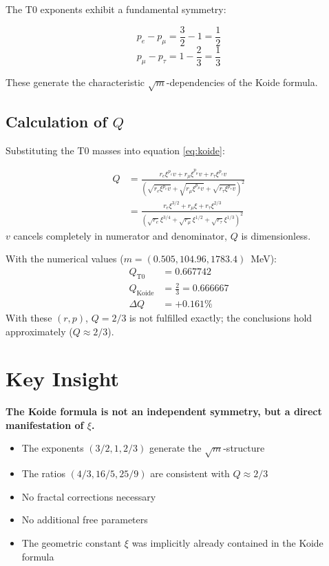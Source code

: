 	The T0 exponents exhibit a fundamental symmetry:
	
	\begin{equation}
		p_e - p_\mu = \frac{3}{2} - 1 = \frac{1}{2}
	\end{equation}
	\begin{equation}
		p_\mu - p_\tau = 1 - \frac{2}{3} = \frac{1}{3}
	\end{equation}
	
	These generate the characteristic $\sqrt{m}$-dependencies of the Koide formula.
	
	\subsection{Calculation of $Q$}
	
	Substituting the T0 masses into equation \eqref{eq:koide}:
	
	\begin{align}
		Q &= \frac{r_e \xi^{p_e} v + r_\mu \xi^{p_\mu} v + r_\tau \xi^{p_\tau} v}{\left(\sqrt{r_e \xi^{p_e} v} + \sqrt{r_\mu \xi^{p_\mu} v} + \sqrt{r_\tau \xi^{p_\tau} v}\right)^2} \\
		&= \frac{r_e \xi^{3/2} + r_\mu \xi + r_\tau \xi^{2/3}}{\left(\sqrt{r_e} \xi^{3/4} + \sqrt{r_\mu} \xi^{1/2} + \sqrt{r_\tau} \xi^{1/3}\right)^2}
	\end{align}
	$v$ cancels completely in numerator and denominator, $Q$ is dimensionless.
	
	With the numerical values ($m = (0.505, 104.96, 1783.4)$~MeV):
	\begin{align}
		Q_{\text{T0}} &= 0.667742 \\
		Q_{\text{Koide}} &= \frac{2}{3} = 0.666667 \\
		\Delta Q &= +0.161\%
	\end{align}
	With these $(r,p)$, $Q = 2/3$ is not fulfilled exactly; the conclusions hold approximately ($Q \approx 2/3$).
	
	\section{Key Insight}
	
	\begin{folgerung}
		\textbf{The Koide formula is not an independent symmetry, but a direct manifestation of $\xi$.}
		
		\begin{itemize}
			\item The exponents $(3/2, 1, 2/3)$ generate the $\sqrt{m}$-structure
			\item The ratios $(4/3, 16/5, 25/9)$ are consistent with $Q \approx 2/3$
			\item No fractal corrections necessary
			\item No additional free parameters
			\item The geometric constant $\xi$ was implicitly already contained in the Koide formula
		\end{itemize}
	\end{folgerung}
	
